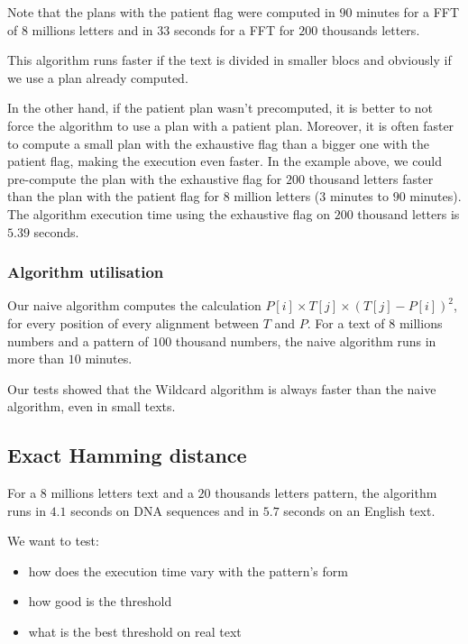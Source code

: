 \documentclass[preprint,12pt]{elsarticle}
\begin{document}
Note that the plans with the patient flag were computed in
$90$ minutes for a FFT of $8$ millions letters
and in $33$ seconds for a FFT for $200$ thousands letters.

This algorithm runs faster if the text is divided in smaller blocs
and obviously if we use a plan already computed.

In the other hand, if the patient plan wasn't precomputed,
it is better to not force the algorithm to use a plan with a patient plan.
Moreover, it is often faster to compute a small plan with the exhaustive flag
than a bigger one with the patient flag, making the execution even faster.
In the example above, we could pre-compute the plan
with the exhaustive flag for $200$ thousand letters faster than
the plan with the patient flag for $8$ million letters ($3$ minutes to $90$ minutes).
The algorithm execution time using the exhaustive flag on $200$ thousand letters is $5.39$ seconds.

\subsubsection*{Algorithm utilisation}

Our naive algorithm computes the calculation $P[i] \times T[j] \times (T[j]-P[i])^2$,
for every position of every alignment between $T$ and $P$.
For a text of $8$ millions numbers and a pattern of $100$ thousand numbers,
the naive algorithm runs in more than $10$ minutes.

Our tests showed that the Wildcard algorithm is always faster than the naive algorithm, even in small texts.





\subsection{Exact Hamming distance}


For a $8$ millions letters text and a $20$ thousands letters pattern, 
the algorithm runs in $4.1$ seconds on DNA sequences and in $5.7$ seconds on an English text.

We want to test:
\begin{itemize}
\setlength\itemsep{-0.4em}
\item how does the execution time vary with the pattern's form
\item how good is the threshold
\item what is the best threshold on real text
\end{itemize}
\end{document}
